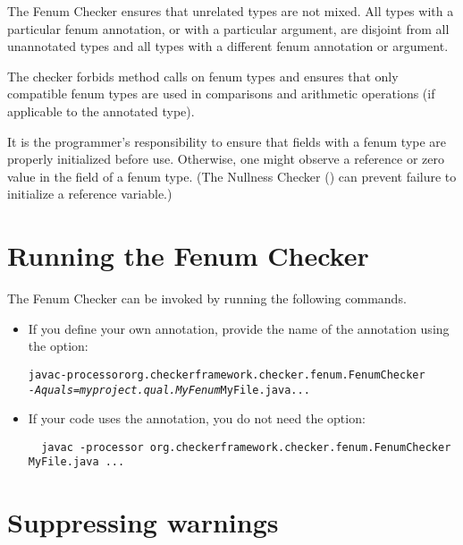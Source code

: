 The Fenum Checker ensures that unrelated types are not mixed. 
All types with a particular fenum annotation, or  with a particular  argument, are
disjoint from all unannotated types and all types with a different fenum
annotation or  argument.

The checker forbids method calls on fenum types and ensures that
only compatible fenum types are used in comparisons and arithmetic operations
(if applicable to the annotated type).

It is the programmer's responsibility to ensure that fields with a fenum type
are properly initialized before use.  Otherwise, one might observe a 
reference or zero value in the field of a fenum type.  (The Nullness Checker
() can prevent failure to initialize a
reference variable.)


\section{Running the Fenum Checker\label{fenum-running}}

The Fenum Checker can be invoked by running the following commands.

\begin{itemize}
  \item 
If you define your own annotation, provide the name of the annotation using the
 option:

\begin{alltt}
  javac -processor org.checkerframework.checker.fenum.FenumChecker
        \textit{-Aquals=myproject.qual.MyFenum} MyFile.java ...
\end{alltt}


\item
If your code uses the  annotation, you do
not need the  option:

\begin{Verbatim}
  javac -processor org.checkerframework.checker.fenum.FenumChecker MyFile.java ...
\end{Verbatim}

\end{itemize}



\section{Suppressing warnings\label{fenum-suppressing}}

